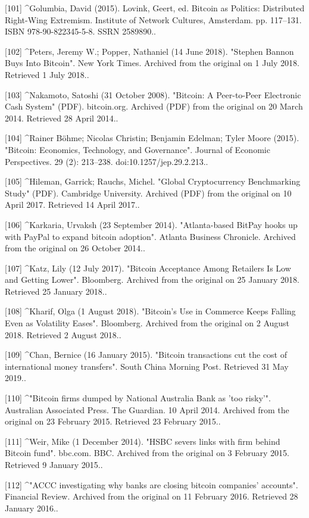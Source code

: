 [101]
^Golumbia, David (2015). Lovink, Geert, ed. Bitcoin as Politics: Distributed Right-Wing Extremism. Institute of Network Cultures, Amsterdam. pp. 117–131. ISBN 978-90-822345-5-8. SSRN 2589890..

[102]
^Peters, Jeremy W.; Popper, Nathaniel (14 June 2018). "Stephen Bannon Buys Into Bitcoin". New York Times. Archived from the original on 1 July 2018. Retrieved 1 July 2018..

[103]
^Nakamoto, Satoshi (31 October 2008). "Bitcoin: A Peer-to-Peer Electronic Cash System" (PDF). bitcoin.org. Archived (PDF) from the original on 20 March 2014. Retrieved 28 April 2014..

[104]
^Rainer Böhme; Nicolas Christin; Benjamin Edelman; Tyler Moore (2015). "Bitcoin: Economics, Technology, and Governance". Journal of Economic Perspectives. 29 (2): 213–238. doi:10.1257/jep.29.2.213..

[105]
^Hileman, Garrick; Rauchs, Michel. "Global Cryptocurrency Benchmarking Study" (PDF). Cambridge University. Archived (PDF) from the original on 10 April 2017. Retrieved 14 April 2017..

[106]
^Karkaria, Urvaksh (23 September 2014). "Atlanta-based BitPay hooks up with PayPal to expand bitcoin adoption". Atlanta Business Chronicle. Archived from the original on 26 October 2014..

[107]
^Katz, Lily (12 July 2017). "Bitcoin Acceptance Among Retailers Is Low and Getting Lower". Bloomberg. Archived from the original on 25 January 2018. Retrieved 25 January 2018..

[108]
^Kharif, Olga (1 August 2018). "Bitcoin's Use in Commerce Keeps Falling Even as Volatility Eases". Bloomberg. Archived from the original on 2 August 2018. Retrieved 2 August 2018..

[109]
^Chan, Bernice (16 January 2015). "Bitcoin transactions cut the cost of international money transfers". South China Morning Post. Retrieved 31 May 2019..

[110]
^"Bitcoin firms dumped by National Australia Bank as 'too risky'". Australian Associated Press. The Guardian. 10 April 2014. Archived from the original on 23 February 2015. Retrieved 23 February 2015..

[111]
^Weir, Mike (1 December 2014). "HSBC severs links with firm behind Bitcoin fund". bbc.com. BBC. Archived from the original on 3 February 2015. Retrieved 9 January 2015..

[112]
^"ACCC investigating why banks are closing bitcoin companies' accounts". Financial Review. Archived from the original on 11 February 2016. Retrieved 28 January 2016..

